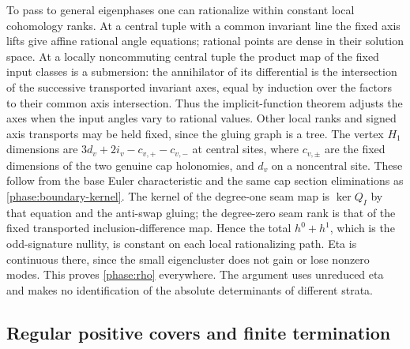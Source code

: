 To pass to general eigenphases one can rationalize within constant local cohomology ranks. At a central tuple with a common invariant line the fixed axis lifts give affine rational angle equations; rational points are dense in their solution space. At a locally noncommuting central tuple the product map of the fixed input classes is a submersion: the annihilator of its differential is the intersection of the successive transported invariant axes, equal by induction over the factors to their common axis intersection. Thus the implicit-function theorem adjusts the axes when the input angles vary to rational values. Other local ranks and signed axis transports may be held fixed, since the gluing graph is a tree. The vertex \(H_1\) dimensions are \(3d_v+2i_v-c_{v,+}-c_{v,-}\) at central sites, where \(c_{v,\pm}\) are the fixed dimensions of the two genuine cap holonomies, and \(d_v\) on a noncentral site. These follow from the base Euler characteristic and the same cap section eliminations as \eqref{phase:boundary-kernel}. The kernel of the degree-one seam map is \(\ker Q_I\) by that equation and the anti-swap gluing; the degree-zero seam rank is that of the fixed transported inclusion-difference map. Hence the total \(h^0+h^1\), which is the odd-signature nullity, is constant on each local rationalizing path. Eta is continuous there, since the small eigencluster does not gain or lose nonzero modes. This proves \eqref{phase:rho} everywhere. The argument uses unreduced eta and makes no identification of the absolute determinants of different strata.

\subsection{Regular positive covers and finite termination}
\label{phase:regular-cover}

